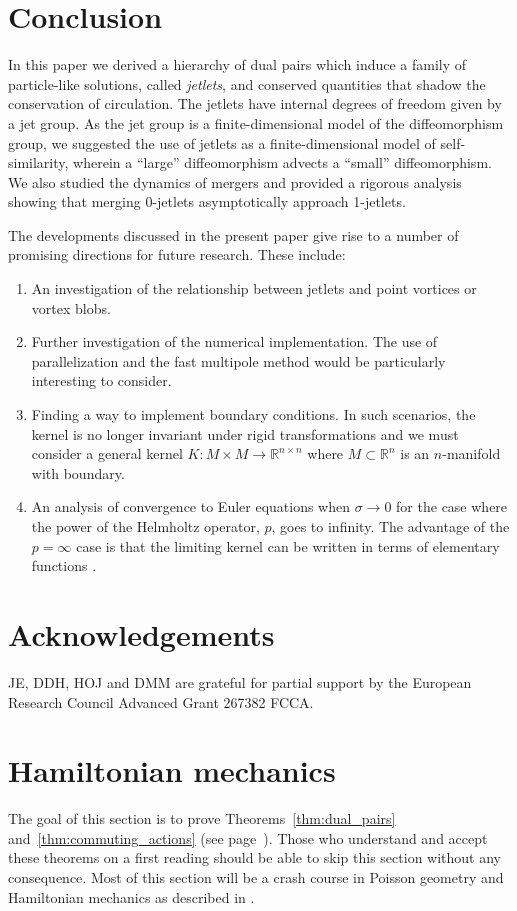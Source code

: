 \documentclass[12pt]{amsart}
\begin{document}
\section{Conclusion}
  In this paper we derived a hierarchy of dual pairs
  which induce a family of particle-like solutions, called \emph{jetlets}, and conserved quantities
  that shadow the conservation of circulation.
  The jetlets have internal degrees of freedom given by a jet group.
  As the jet group is a finite-dimensional model of the diffeomorphism
  group, we suggested the use of jetlets as a finite-dimensional model
  of self-similarity, wherein a ``large'' diffeomorphism advects a ``small''
  diffeomorphism.
  We also studied the dynamics of mergers and provided a rigorous analysis showing that merging
  0-jetlets asymptotically approach 1-jetlets.

The developments discussed in the present paper give rise to a number of promising directions for future research. These include:
\begin{enumerate}
	\item An investigation of the relationship between jetlets and point vortices or vortex blobs.
	\item Further investigation of the numerical implementation.
		The use of parallelization and the fast multipole method would be particularly interesting to consider.
	\item Finding a way to implement boundary conditions.
		In such scenarios, the kernel is no longer invariant under rigid transformations
		and we must consider a general kernel $K:M \times M \to \mathbb{R}^{n \times n}$
		where $M \subset \mathbb{R}^n$ is an $n$-manifold with boundary.
        \item An analysis of convergence to Euler equations when $\sigma \to 0$ for the case where the power of the Helmholtz operator, $p$, goes to infinity.  The advantage of the $p=\infty$ case is that the limiting kernel can be written in terms of elementary functions \cite{MicheliGlaunes2014}.
\end{enumerate}

\section{Acknowledgements}
JE, DDH, HOJ and DMM are grateful for partial support by the European Research Council Advanced Grant 267382 FCCA.

\appendix

\section{Hamiltonian mechanics}
\label{sec:Hamiltonian}
The goal of this section is to prove Theorems~\ref{thm:dual_pairs}
and~\ref{thm:commuting_actions} (see page~\pageref{thm:dual_pairs}).
Those who understand and accept these theorems on a first reading
should be able to skip this section without any consequence.
Most of this section will be a crash course in Poisson geometry
and Hamiltonian mechanics as described in \cite{FOM,MandS,Weinstein1983}.
\end{document}
